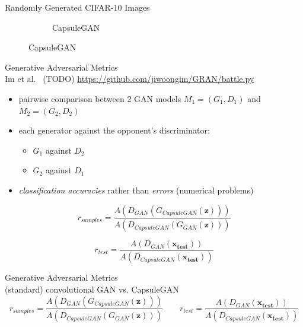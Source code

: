 \documentclass{beamer}
\newcommand{\gamCitation}{
  (TODO)
}
\begin{document}
{\begin{frame}{Randomly Generated CIFAR-10 Images}
\begin{figure}
\begin{subfigure}{.49\textwidth}
          \caption{CapsuleGAN}
          \label{fig:capsgan_cifar10_randomly_generated}
        \end{subfigure}
      \end{figure}
    \end{frame}

    \begin{frame}{Generative Adversarial Metrics\\
        \tiny Im et al.~\gamCitation \url{https://github.com/jiwoongim/GRAN/battle.py}}
      \pause
      \begin{itemize}[<+- | alert@+>]
        \item pairwise comparison between 2 GAN models $M_1 = (G_1, D_1)$ and $M_2 = (G_2, D_2)$ 
        \item each generator against the opponent's discriminator:
          \begin{itemize}[<+- | alert@+>]
            \item $G_1$ against $D_2$
            \item $G_2$ against $D_1$
          \end{itemize}
        \item \emph{classification accuracies} rather than \emph{errors} (numerical problems)
      \end{itemize}
      \pause

      \begin{equation*}
        r_{samples} = \frac{A(D_{GAN}(G_{CapsuleGAN}(\mathbf{z})))}{A(D_{CapsuleGAN}(G_{GAN}(\mathbf{z})))}
      \end{equation*}
      \pause

      \begin{equation*}
        r_{test} = \frac{A(D_{GAN}(\mathbf{x_{test}}))}{A(D_{CapsuleGAN}(\mathbf{x_{test}}))}
      \end{equation*}
    \end{frame}

    \begin{frame}{Generative Adversarial Metrics\\
        \tiny (standard) convolutional GAN vs. CapsuleGAN}
      \pause
      \begin{equation*}
        r_{samples} = \frac{A(D_{GAN}(G_{CapsuleGAN}(\mathbf{z})))}{A(D_{CapsuleGAN}(G_{GAN}(\mathbf{z})))}
        \qquad
        r_{test} = \frac{A(D_{GAN}(\mathbf{x_{test}}))}{A(D_{CapsuleGAN}(\mathbf{x_{test}}))}
      \end{equation*}
      \pause


\end{frame}}
\end{document}
